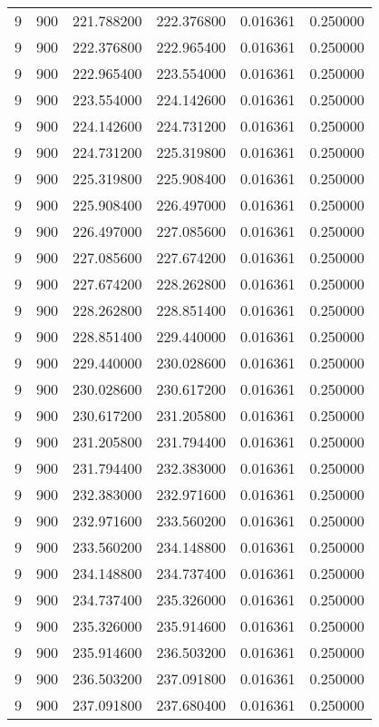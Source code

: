 \begin{longtable}{rrrrrr}
9 & 900 & 221.788200 & 222.376800 & 0.016361 & 0.250000 \\
9 & 900 & 222.376800 & 222.965400 & 0.016361 & 0.250000 \\
9 & 900 & 222.965400 & 223.554000 & 0.016361 & 0.250000 \\
9 & 900 & 223.554000 & 224.142600 & 0.016361 & 0.250000 \\
9 & 900 & 224.142600 & 224.731200 & 0.016361 & 0.250000 \\
9 & 900 & 224.731200 & 225.319800 & 0.016361 & 0.250000 \\
9 & 900 & 225.319800 & 225.908400 & 0.016361 & 0.250000 \\
9 & 900 & 225.908400 & 226.497000 & 0.016361 & 0.250000 \\
9 & 900 & 226.497000 & 227.085600 & 0.016361 & 0.250000 \\
9 & 900 & 227.085600 & 227.674200 & 0.016361 & 0.250000 \\
9 & 900 & 227.674200 & 228.262800 & 0.016361 & 0.250000 \\
9 & 900 & 228.262800 & 228.851400 & 0.016361 & 0.250000 \\
9 & 900 & 228.851400 & 229.440000 & 0.016361 & 0.250000 \\
9 & 900 & 229.440000 & 230.028600 & 0.016361 & 0.250000 \\
9 & 900 & 230.028600 & 230.617200 & 0.016361 & 0.250000 \\
9 & 900 & 230.617200 & 231.205800 & 0.016361 & 0.250000 \\
9 & 900 & 231.205800 & 231.794400 & 0.016361 & 0.250000 \\
9 & 900 & 231.794400 & 232.383000 & 0.016361 & 0.250000 \\
9 & 900 & 232.383000 & 232.971600 & 0.016361 & 0.250000 \\
9 & 900 & 232.971600 & 233.560200 & 0.016361 & 0.250000 \\
9 & 900 & 233.560200 & 234.148800 & 0.016361 & 0.250000 \\
9 & 900 & 234.148800 & 234.737400 & 0.016361 & 0.250000 \\
9 & 900 & 234.737400 & 235.326000 & 0.016361 & 0.250000 \\
9 & 900 & 235.326000 & 235.914600 & 0.016361 & 0.250000 \\
9 & 900 & 235.914600 & 236.503200 & 0.016361 & 0.250000 \\
9 & 900 & 236.503200 & 237.091800 & 0.016361 & 0.250000 \\
9 & 900 & 237.091800 & 237.680400 & 0.016361 & 0.250000 \\

\end{longtable}
